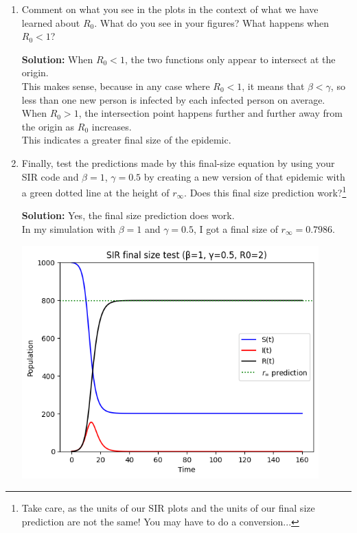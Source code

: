 \documentclass[11pt]{article}
\newenvironment{solution}{\par\noindent\begingroup\color{BrickRed}\textbf{Solution:} }{\par\endgroup}
\begin{document}
\begin{enumerate}
\begin{enumerate}[label=\alph*.]
		
		\item Comment on what you see in the plots in the context of what we have learned about $R_0$. 
		      What do you see in your figures? What happens when $R_0 < 1$?
			\begin{solution} \newline \newline
				When $R_0 < 1$, the two functions only appear to intersect at the origin. \\
				This makes sense, because in any case where $R_0 < 1$, it means that $\beta < \gamma$,
				so less than one new person is infected by each infected person on average. \\
				When $R_0 > 1$, the intersection point happens further and further away from the origin as $R_0$ increases. \\
				This indicates a greater final size of the epidemic. \\
			\end{solution}
		\item Finally, test the predictions made by this final-size equation by using your SIR code and $\beta=1$, $\gamma=0.5$ by creating a new version of that epidemic with a green dotted line at the height of $r_\infty$. Does this final size prediction work?\footnote{Take care, as the units of our SIR plots and the units of our final size prediction are not the same! You may have to do a conversion...}
			\begin{solution} \newline \newline
				Yes, the final size prediction does work. \\
				In my simulation with $\beta = 1$ and $\gamma = 0.5$, I got a final size of $r_\infty = 0.7986$.
			\end{solution}
			\begin{center}
			  \includegraphics[width=0.9\textwidth, height=0.6\textheight, keepaspectratio]{final-size-test.png}
			\end{center}
	\end{enumerate}
	


\end{enumerate}
\end{document}
